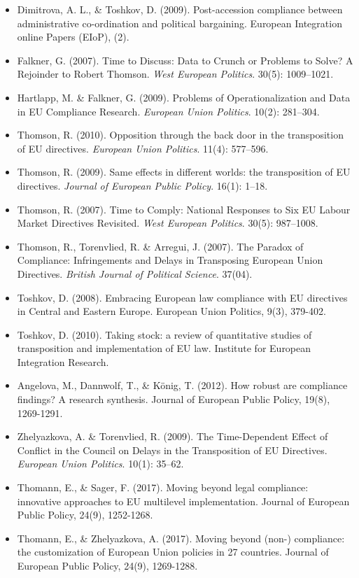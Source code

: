 \begin{itemize}
	\item Dimitrova, A. L., \& Toshkov, D. (2009). Post-accession compliance between administrative co-ordination and political bargaining. European Integration online Papers (EIoP), (2).
	\item Falkner, G. (2007). Time to Discuss: Data to Crunch or Problems to Solve? A Rejoinder to Robert Thomson. \textit{West European Politics}. 30(5): 1009–1021.
	\item Hartlapp, M. \& Falkner, G. (2009). Problems of Operationalization and Data in EU Compliance Research. \textit{European Union Politics}. 10(2): 281–304.
	\item Thomson, R. (2010). Opposition through the back door in the transposition of EU directives. \textit{European Union Politics}. 11(4): 577–596.
	\item Thomson, R. (2009). Same effects in different worlds: the transposition of EU directives. \textit{Journal of European Public Policy}. 16(1): 1–18.
	\item Thomson, R. (2007). Time to Comply: National Responses to Six EU Labour Market Directives Revisited. \textit{West European Politics}. 30(5): 987–1008.
	\item Thomson, R., Torenvlied, R. \& Arregui, J. (2007). The Paradox of Compliance: Infringements and Delays in Transposing European Union Directives. \textit{British Journal of Political Science}. 37(04).
	\item Toshkov, D. (2008). Embracing European law compliance with EU directives in Central and Eastern Europe. European Union Politics, 9(3), 379-402.
	\item Toshkov, D. (2010). Taking stock: a review of quantitative studies of transposition and implementation of EU law. Institute for European Integration Research.
	\item Angelova, M., Dannwolf, T., \& K{\"o}nig, T. (2012). How robust are compliance findings? A research synthesis. Journal of European Public Policy, 19(8), 1269-1291.
	\item Zhelyazkova, A. \& Torenvlied, R. (2009). The Time-Dependent Effect of Conflict in the Council on Delays in the Transposition of EU Directives. \textit{European Union Politics}. 10(1): 35–62.
	\item Thomann, E., \& Sager, F. (2017). Moving beyond legal compliance: innovative approaches to EU multilevel implementation. Journal of European Public Policy, 24(9), 1252-1268.
	\item Thomann, E., \& Zhelyazkova, A. (2017). Moving beyond (non-) compliance: the customization of European Union policies in 27 countries. Journal of European Public Policy, 24(9), 1269-1288.

\end{itemize}
